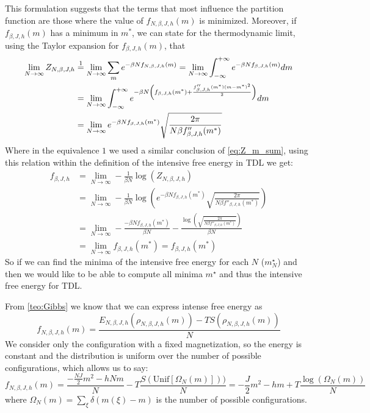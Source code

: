 \noindent This formulation suggests that the terms that most influence the partition function are those where the value of $f_{N,\beta,J,h}(m)$ is minimized. Moreover, if $f_{\beta,J,h}(m)$ has a minimum in $m^*$, we can state for the thermodynamic limit, using the Taylor expansion for $f_{\beta,J,h}(m)$, that
\begin{align*}
    \lim_{N\to\infty}Z_{N,\beta,J,h} &\overset{1}{=}  \lim_{N\to\infty}\sum_m e^{-\beta N f_{N,\beta,J,h}(m)} = \lim_{N\to\infty} \int_{-\infty}^{+\infty}  e^{-\beta N f_{\beta,J,h}(m)}dm \\
    &=\lim_{N\to\infty} \int_{-\infty}^{+\infty} e^{-\beta N\left(f_{\beta,J,h}(m^*) + \frac{f''_{\beta,J,h}(m^*)(m-m^*)^2}{2} \right)}dm\\
    &= \lim_{N\to\infty}e^{-\beta N f_{\beta,J,h}(m^*) } \sqrt{\frac{2\pi}{N\beta f''_{\beta,J,h}(m^*)}}
\end{align*}
Where in the equivalence $1$ we used a similar conclusion of \cref{eq:Z_m_sum}, using this relation within the definition of the intensive free energy in TDL we get:
\begin{align*}
    f_{\beta,J,h} &= \lim_{N \to \infty}  -\frac{1}{\beta N} \log(Z_{N,\beta,J,h})  \\
    &= \lim_{N \to \infty}  -\frac{1}{\beta N} \log\left(e^{-\beta N f_{\beta,J,h}(m^*) } \sqrt{\frac{2\pi}{N\beta f''_{\beta,J,h}(m^*)}} \right)\\
    &=  \lim_{N \to \infty} -\frac{-\beta N  f_{\beta,J,h}(m^*)}{\beta N}  -\frac{\log\left(\sqrt{\frac{2\pi}{N\beta f''_{\beta,J,h}(m^*)}} \right)}{\beta N}\\
    &=  \lim_{N \to \infty} f_{\beta,J,h}(m^*) =  f_{\beta,J,h}(m^*)
\end{align*}
So if we can find the minima of the intensive free energy for each $N$ ($m^\star_N$) and then we would like to be able to compute all minima $m^\star$ and thus the intensive free energy for TDL.

\bigskip\noindent From \cref{teo:Gibbs} we know that we can express intense free energy as
\[
     f_{N,\beta,J,h}(m) = \frac{E_{N,\beta,J,h}(\rho_{N,\beta,J,h}(m)) - T S(\rho_{N,\beta,J,h}(m))}{N}
\]
We consider only the configuration with a fixed magnetization, so the energy is constant and the distribution is uniform over the number of possible configurations, which allows us to say:
\[
    f_{N,\beta,J,h}(m) = \frac{- \frac{NJ}{2} m^2 - h N m}{N} - T \frac{S(\text{Unif}\left[\Omega_N(m)\right]))}{N} = - \frac{J}{2} m^2 - h  m +
    T \frac{\log(\Omega_N(m))}{N}
\]
where $\Omega_N(m) = \sum_\xi \delta(m(\xi)-m)$ is the number of possible configurations.

